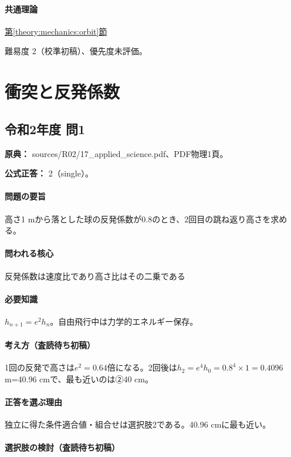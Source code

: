 \paragraph{共通理論} \hyperref[theory:mechanics:orbit]{第\ref*{theory:mechanics:orbit}節}

\par 難易度 2（校準初稿）、優先度未評価。

\section{衝突と反発係数}

\subsection{令和2年度 問1}
\label{q:r02-reg-applied-01}

\noindent\textbf{原典：} sources/R02/17\_applied\_science.pdf、PDF物理1頁。

\textbf{公式正答：} 2（single）。

\paragraph{問題の要旨} 高さ1 mから落とした球の反発係数が0.8のとき、2回目の跳ね返り高さを求める。

\paragraph{問われる核心} 反発係数は速度比であり高さ比はその二乗である

\paragraph{必要知識} \(h_{n+1}=e^2h_n\)。自由飛行中は力学的エネルギー保存。

\paragraph{考え方（査読待ち初稿）} 1回の反発で高さは\(e^2=0.64\)倍になる。2回後は\(h_2=e^4h_0=0.8^4\times1=0.4096\) m=40.96 cmで、最も近いのは②40 cm。

\paragraph{正答を選ぶ理由} 独立に得た条件適合値・組合せは選択肢2である。40.96 cmに最も近い。

\paragraph{選択肢の検討（査読待ち初稿）}

